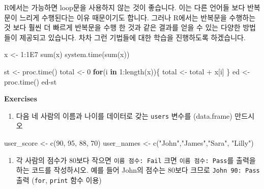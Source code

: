\documentclass[
]{book}
\newenvironment{Shaded}{\begin{snugshade}}{\end{snugshade}}
\newcommand{\ControlFlowTok}[1]{\textcolor[rgb]{0.13,0.29,0.53}{\textbf{#1}}}
\newcommand{\DecValTok}[1]{\textcolor[rgb]{0.00,0.00,0.81}{#1}}
\newcommand{\FloatTok}[1]{\textcolor[rgb]{0.00,0.00,0.81}{#1}}
\newcommand{\FunctionTok}[1]{\textcolor[rgb]{0.00,0.00,0.00}{#1}}
\newcommand{\NormalTok}[1]{#1}
\newcommand{\OtherTok}[1]{\textcolor[rgb]{0.56,0.35,0.01}{#1}}
\newcommand{\SpecialCharTok}[1]{\textcolor[rgb]{0.00,0.00,0.00}{#1}}
\newcommand{\StringTok}[1]{\textcolor[rgb]{0.31,0.60,0.02}{#1}}
\providecommand{\tightlist}{%
  \setlength{\itemsep}{0pt}\setlength{\parskip}{0pt}}
\begin{document}
R에서는 가능하면 loop문을 사용하지 않는 것이 좋습니다. 이는 다른 언어들 보다 반복문이 느리게 수행된다는 이유 때문이기도 합니다. 그러나 R에서는 반복문을 수행하는 것 보다 훨씬 더 빠르게 반복문을 수행 한 것과 같은 결과를 얻을 수 있는 다양한 방법들이 제공되고 있습니다. 차차 그런 기법들에 대한 학습을 진행하도록 하겠습니다.

\begin{Shaded}
\begin{Highlighting}[]
\NormalTok{x }\OtherTok{\textless{}{-}} \DecValTok{1}\SpecialCharTok{:}\FloatTok{1E7}
\FunctionTok{sum}\NormalTok{(x)}
\FunctionTok{system.time}\NormalTok{(}\FunctionTok{sum}\NormalTok{(x))}

\NormalTok{st }\OtherTok{\textless{}{-}} \FunctionTok{proc.time}\NormalTok{()}
\NormalTok{total }\OtherTok{\textless{}{-}} \DecValTok{0}
\ControlFlowTok{for}\NormalTok{(i }\ControlFlowTok{in} \DecValTok{1}\SpecialCharTok{:}\FunctionTok{length}\NormalTok{(x))\{}
\NormalTok{  total }\OtherTok{\textless{}{-}}\NormalTok{ total }\SpecialCharTok{+}\NormalTok{ x[i]}
\NormalTok{\}}
\NormalTok{ed }\OtherTok{\textless{}{-}} \FunctionTok{proc.time}\NormalTok{()}
\NormalTok{ed}\SpecialCharTok{{-}}\NormalTok{st}
\end{Highlighting}
\end{Shaded}

\textbf{Exercises}

\begin{enumerate}
\def\labelenumi{\arabic{enumi}.}
\tightlist
\item
  다음 네 사람의 이름과 나이를 데이터로 갖는 \texttt{users} 변수를 (data.frame) 만드시오
\end{enumerate}

\begin{Shaded}
\begin{Highlighting}[]
\NormalTok{user\_score }\OtherTok{\textless{}{-}} \FunctionTok{c}\NormalTok{(}\DecValTok{90}\NormalTok{, }\DecValTok{95}\NormalTok{, }\DecValTok{88}\NormalTok{, }\DecValTok{70}\NormalTok{)}
\NormalTok{user\_names }\OtherTok{\textless{}{-}} \FunctionTok{c}\NormalTok{(}\StringTok{"John"}\NormalTok{,}\StringTok{"James"}\NormalTok{,}\StringTok{"Sara"}\NormalTok{, }\StringTok{"Lilly"}\NormalTok{)}
\end{Highlighting}
\end{Shaded}

\begin{enumerate}
\def\labelenumi{\arabic{enumi}.}
\setcounter{enumi}{1}
\tightlist
\item
  각 사람의 점수가 80보다 작으면 \texttt{이름\ 점수:\ Fail} 크면 \texttt{이름\ 점수:\ Pass}를 출력을 하는 코드를 작성하시오. 예를 들어 John의 점수는 80보다 크므로 \texttt{John\ 90:\ Pass} 출력 (\texttt{for}, \texttt{print} 함수 이용)
\end{enumerate}
\end{document}
